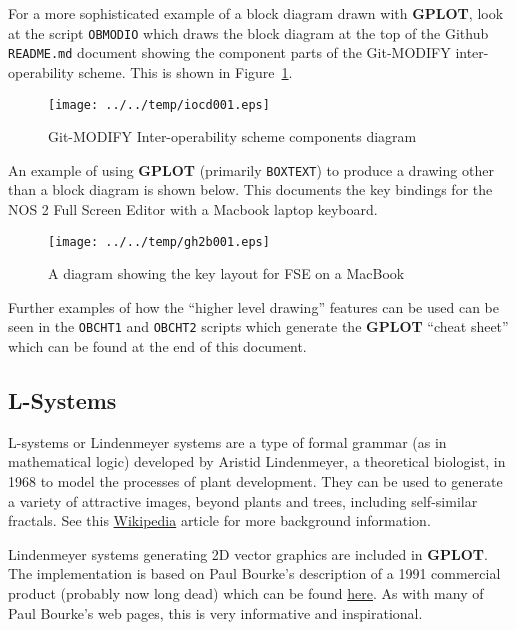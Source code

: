 \documentclass[a4paper,twoside,11pt]{article}
\makeatletter
\def\maxwidth{%
  \ifdim\Gin@nat@width>\linewidth
    \linewidth
  \else
    \Gin@nat@width
  \fi
}
\newcommand{\newpara}{\par\vspace{4mm}\noindent}
\makeatother
\begin{document}
\newpara
For a more sophisticated example of a block diagram drawn with \textbf{GPLOT},
look at the script \texttt{OBMODIO} which draws the block diagram at the
top of the Github \texttt{README.md} document showing
the component parts of the Git-MODIFY
inter-operability scheme. This is shown in Figure~\ref{fig:iocd001}.

\begin{figure}
  \centering
  \texttt{[image: ../../temp/iocd001.eps]}
  \caption{Git-MODIFY Inter-operability scheme components diagram}
  \label{fig:iocd001}
\end{figure}

\newpara
An example of using \textbf{GPLOT} (primarily \texttt{BOXTEXT}) to produce a
drawing other than a block diagram is shown below. This documents the
key bindings for the NOS 2 Full Screen Editor with a Macbook laptop
keyboard.

\begin{figure}
  \centering
  \texttt{[image: ../../temp/gh2b001.eps]}
  \caption{A diagram showing the key layout for FSE on a MacBook}
  \label{fig:gh2b001}
\end{figure}

\newpara
Further examples of how the ``higher level drawing'' features can be
used can be seen in the \texttt{OBCHT1} and \texttt{OBCHT2} scripts
which generate the \textbf{GPLOT} ``cheat sheet'' which can be found at the end
of this document.

\subsection{L-Systems}\label{l-systems}
\newpara
L-systems or Lindenmeyer systems are a type of formal grammar (as in
mathematical logic) developed by Aristid Lindenmeyer, a theoretical
biologist, in 1968 to model the processes of plant development. They can
be used to generate a variety of attractive images, beyond plants and
trees, including self-similar fractals. See this
\href{https://en.wikipedia.org/wiki/L-system}{Wikipedia} article for
more background information.

\newpara
Lindenmeyer systems generating 2D vector graphics are included in \textbf{GPLOT}.
The implementation is based on Paul Bourke's description of a 1991
commercial product (probably now long dead) which can be found
\href{https://paulbourke.net/fractals/lsys/}{here}. As with many of Paul
Bourke's web pages, this is very informative and inspirational.
\end{document}
